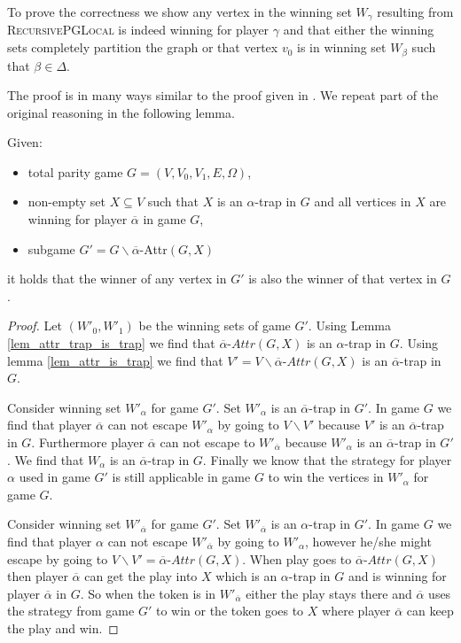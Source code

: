 To prove the correctness we show any vertex in the winning set $W_\gamma$ resulting from \textsc{RecursivePGLocal} is indeed winning for player $\gamma$ and that either the winning sets completely partition the graph or that vertex $v_0$ is in winning set $W_\beta$ such that $\beta \in \Delta$.

The proof is in many ways similar to the proof given in \cite{ZIELONKA1998135}. We repeat part of the original reasoning in the following lemma.
\begin{lemma}
\label{lem_GwithoutB_is_subset}
	Given:
	\begin{itemize}
		\item total parity game $G = (V,V_0,V_1,E,\Omega)$,
		\item non-empty set $X \subseteq V$ such that $X$ is an $\alpha$-trap in $G$ and all vertices in $X$ are winning for player $\overline{\alpha}$ in game $G$,
		\item subgame $G' = G\backslash \overline{\alpha}$-Attr$(G,X)$
	\end{itemize}
	it holds that the winner of any vertex in $G'$ is also the winner of that vertex in $G$.
	\begin{proof}
		Let $(W'_0, W'_1)$ be the winning sets of game $G'$. Using Lemma \ref{lem_attr_trap_is_trap} we find that $\overline{\alpha}\textit{-Attr}(G,X)$ is an $\alpha$-trap in $G$. Using lemma \ref{lem_attr_is_trap} we find that $V' = V\backslash \overline{\alpha}\textit{-Attr}(G,X)$ is an $\overline{\alpha}$-trap in $G$.
		
		Consider winning set $W'_\alpha$ for game $G'$. Set $W'_\alpha$ is an $\overline{\alpha}$-trap in $G'$. In game $G$ we find that player $\overline{\alpha}$ can not escape $W'_\alpha$ by going to $V\backslash  V'$ because $V'$ is an $\overline{\alpha}$-trap in $G$. Furthermore player $\overline{\alpha}$ can not escape to $W'_{\overline{\alpha}}$ because $W'_\alpha$ is an $\overline{\alpha}$-trap in $G'$. We find that $W_\alpha$ is an $\overline{\alpha}$-trap in $G$. Finally we know that the strategy for player $\alpha$ used in game $G'$ is still applicable in game $G$ to win the vertices in $W'_\alpha$ for game $G$.
		
		Consider winning set $W'_{\overline{\alpha}}$ for game $G'$. Set $W'_{\overline{\alpha}}$ is an $\alpha$-trap in $G'$. In game $G$ we find that player $\alpha$ can not escape $W'_{\overline{\alpha}}$ by going to $W'_\alpha$, however he/she might escape by going to $V\backslash V' = \overline{\alpha}\textit{-Attr}(G,X)$. When play goes to $\overline{\alpha}\textit{-Attr}(G,X)$ then player $\overline{\alpha}$ can get the play into $X$ which is an $\alpha$-trap in $G$ and is winning for player $\overline{\alpha}$ in $G$. So when the token is in $W'_{\overline{\alpha}}$ either the play stays there and $\overline{\alpha}$ uses the strategy from game $G'$ to win or the token goes to $X$ where player $\overline{\alpha}$ can keep the play and win.
	\end{proof}
\end{lemma}
